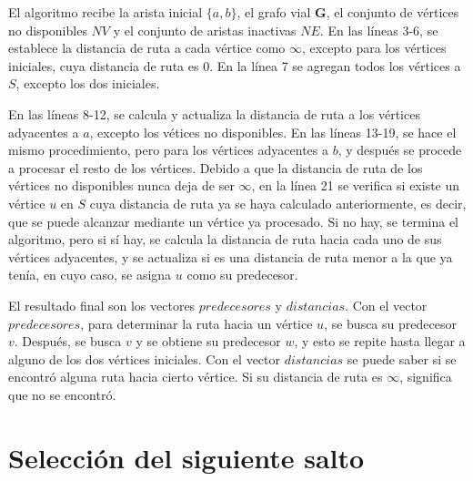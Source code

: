 El algoritmo recibe la arista inicial $\{a,b\}$, el grafo vial $\mathbf{G}$,
el conjunto de vértices no disponibles $NV$ y el conjunto de aristas inactivas
$NE$. En las líneas 3-6, se establece la distancia de ruta a cada vértice como
$\infty$, excepto para los vértices iniciales, cuya distancia de ruta es 0. En
la línea 7 se agregan todos los vértices a $S$, excepto los dos iniciales.

En las líneas 8-12, se calcula y actualiza la distancia de ruta a los vértices
adyacentes a $a$, excepto los vétices no disponibles. En las líneas 13-19, se
hace el mismo procedimiento, pero para los vértices adyacentes a $b$, y después
se procede a procesar el resto de los vértices. Debido a que la distancia de
ruta de los vértices no disponibles nunca deja de ser $\infty$, en la línea 21
se verifica si existe un vértice $u$ en $S$ cuya distancia de ruta ya se haya
calculado anteriormente, es decir, que se puede alcanzar mediante un vértice ya
procesado. Si no hay, se termina el algoritmo, pero si sí hay, se calcula la
distancia de ruta hacia cada uno de sus vértices adyacentes, y se actualiza si
es una distancia de ruta menor a la que ya tenía, en cuyo caso, se asigna $u$
como su predecesor.

El resultado final son los vectores $predecesores$ y $distancias$. Con el
vector $predecesores$, para determinar la ruta hacia un vértice $u$, se busca
su predecesor $v$. Después, se busca $v$ y se obtiene su predecesor $w$, y esto
se repite hasta llegar a alguno de los dos vértices iniciales. Con el vector
$distancias$ se puede saber si se encontró alguna ruta hacia cierto vértice. Si
su distancia de ruta es $\infty$, significa que no se encontró.

\section{Selección del siguiente salto}
\label{subsec:seleccion_siguiente_salto}

